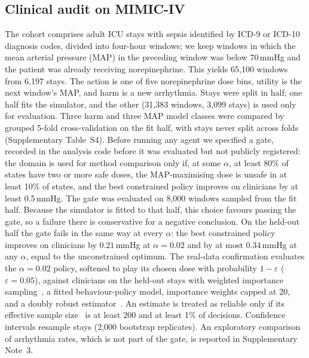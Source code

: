 \documentclass[10pt,a4paper]{article}
\begin{document}
\subsection*{Clinical audit on MIMIC-IV}
The cohort comprises adult ICU stays with sepsis identified by ICD-9 or ICD-10 diagnosis codes, divided
into four-hour windows; we keep windows in which the mean arterial pressure (MAP) in the preceding
window was below 70\,mmHg and the patient was already receiving norepinephrine. This yields 65,100
windows from 6,197 stays. The action is one of five norepinephrine dose bins, utility is the next
window's MAP, and harm is a new arrhythmia. Stays were split in half; one half fits the simulator, and
the other (31,383 windows, 3,099 stays) is used only for evaluation. Three harm and three MAP model classes were compared by grouped 5-fold cross-validation on the fit half, with stays never split across folds (Supplementary Table~S4). Before running any agent we specified a gate, recorded in the analysis code before it was evaluated but not publicly registered: the domain is used for method comparison only if, at some $\alpha$, at least 80\%
of states have two or more safe doses, the MAP-maximising dose is unsafe in at least 10\% of states,
and the best constrained policy improves on clinicians by at least 0.5\,mmHg. The gate was evaluated on 8,000 windows sampled from the fit half. Because the simulator is fitted to that half, this choice favours passing the gate, so a failure there is conservative for a negative conclusion. On the held-out half the gate fails in the same way at every $\alpha$: the best constrained policy improves on clinicians by $0.21$\,mmHg at $\alpha=0.02$ and by at most $0.34$\,mmHg at any $\alpha$, equal to the unconstrained optimum. The real-data confirmation evaluates the $\alpha=0.02$
policy, softened to play its chosen dose with probability $1-\varepsilon$ ($\varepsilon=0.05$), against
clinicians on the held-out stays with weighted importance sampling~\cite{precup2000}, a fitted
behaviour-policy model, importance weights capped at 20, and a doubly robust
estimator~\cite{dudik2011,jiang2016}. An estimate is treated as reliable only if its effective sample
size~\cite{kong1992} is at least 200 and at least 1\% of decisions. Confidence intervals resample stays
(2,000 bootstrap replicates). An exploratory comparison of arrhythmia rates, which is not part of the gate, is reported in Supplementary Note~3.
\end{document}
